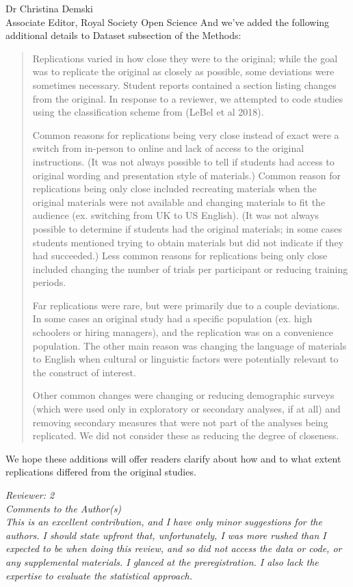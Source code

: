 \documentclass{stanfordletter}
\newcommand{\theysaid}[1]{\begin{leftbar} \noindent 
		\textsl{ #1}\end{leftbar}}
\newcommand{\revised}[1]{\begin{quote}	#1 \end{quote}}
\begin{document}
\begin{letter}{Dr Christina Demski \\ Associate Editor, Royal Society Open Science}
          And we've added the following additional details to Dataset subsection of the Methods:
          
          \revised{
          	Replications varied in how close they were to the original; while the goal was to replicate the original as closely as possible, some deviations were sometimes necessary. Student reports contained a section listing changes from the original. In response to a reviewer, we attempted to code studies using the classification scheme from (LeBel et al 2018).
          	
          	
          	Common reasons for replications being very close instead of exact were a switch from in-person to online and lack of access to the original instructions. (It was not always possible to tell if students had access to original wording and presentation style of materials.) Common reason for replications being only close included recreating materials when the original materials were not available and changing materials to fit the audience (ex. switching from UK to US English). (It was not always possible to determine if students had the original materials; in some cases students mentioned trying to obtain materials but did not indicate if they had succeeded.) Less common reasons for replications being only close included changing the number of trials per participant or reducing training periods.
          	
          	
          	Far replications were rare, but were primarily due to a couple deviations. In some cases an original study had a specific population (ex. high schoolers or hiring managers), and the replication was on a convenience population. The other main reason was changing the language of materials to English when cultural or linguistic factors were potentially relevant to the construct of interest.
          	
          	
          	Other common changes were changing or reducing demographic surveys (which were used only in exploratory or secondary analyses, if at all) and removing secondary measures that were not part of the analyses being replicated. We did not consider these as reducing the degree of closeness.
          	
          	}
         
         We hope these additions will offer readers clarify about how and to what extent replications differed from the original studies. 
          

          
          \theysaid{Reviewer: 2\\
          	Comments to the Author(s)\\
          	This is an excellent contribution, and I have only minor suggestions for the authors. I should state upfront that, unfortunately, I was more rushed than I expected to be when doing this review, and so did not access the data or code, or any supplemental materials.  I glanced at the preregistration.  I also lack the expertise to evaluate the statistical approach.
          }
          	

\end{letter}
\end{document}
